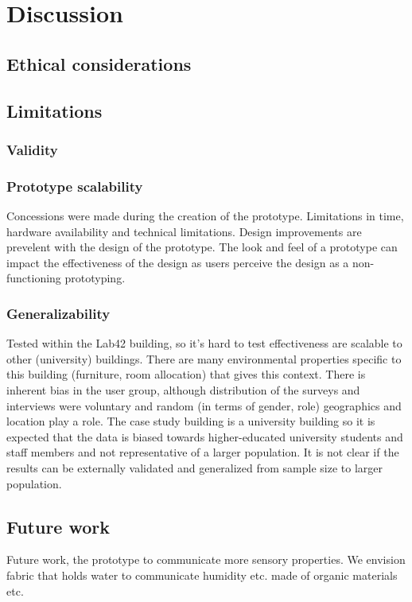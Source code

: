 \section{Discussion}
\label{sec:discussion}

\subsection{Ethical considerations}

\subsection{Limitations}

\subsubsection{Validity}


\subsubsection{Prototype scalability}
Concessions were made during the creation of the prototype. Limitations in time, hardware availability and technical limitations. Design improvements are prevelent with the design of the prototype. The look and feel of a prototype can impact the effectiveness of the design as users perceive the design as a non-functioning prototyping.

\subsubsection{Generalizability}
Tested within the Lab42 building, so it's hard to test effectiveness are scalable to other (university) buildings. There are many environmental properties specific to this building (furniture, room allocation) that gives this context. There is inherent bias in the user group, although distribution of the surveys and interviews were voluntary and random (in terms of gender, role) geographics and location play a role. The case study building is a university building so it is expected that the data is biased towards higher-educated university students and staff members and not representative of a larger population. It is not clear if the results can be externally validated and generalized from sample size to larger population.

\subsection{Future work}

Future work, the prototype to communicate more sensory properties. We envision fabric that holds water to communicate humidity etc. made of organic materials etc.